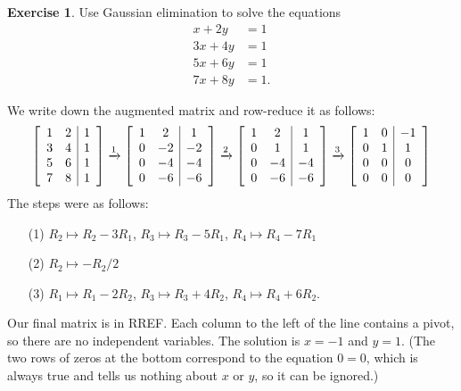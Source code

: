 \documentclass[a4paper]{book}
\theoremstyle{definition}
\newtheorem{exercise}[theorem]{Exercise}
\renewenvironment{solution}{\SolutionInline}{\endSolutionInline}
\begin{document}
\begin{exercise}
 Use Gaussian elimination to solve the equations
 \begin{align*}
  x  + 2y &= 1 \\
  3x + 4y &= 1 \\
  5x + 6y &= 1 \\
  7x + 8y &= 1.
 \end{align*}
\end{exercise}
\begin{solution}
 We write down the augmented matrix and row-reduce it as follows:
 {\small \[
  \left[\begin{array}{cc|c}
    1 &  2 &  1 \\
    3 &  4 &  1 \\
    5 &  6 &  1 \\
    7 &  8 &  1 
  \end{array}\right]
  \xrightarrow{1}
  \left[\begin{array}{cc|c}
    1 &  2 &  1 \\
    0 & -2 & -2 \\
    0 & -4 & -4 \\
    0 & -6 & -6 
  \end{array}\right]
  \xrightarrow{2}
  \left[\begin{array}{cc|c}
    1 &  2 &  1 \\
    0 &  1 &  1 \\
    0 & -4 & -4 \\
    0 & -6 & -6 
  \end{array}\right]
  \xrightarrow{3}
  \left[\begin{array}{cc|c}
    1 &  0 & -1 \\
    0 &  1 &  1 \\
    0 &  0 &  0 \\
    0 &  0 &  0 
  \end{array}\right]
 \]}
 The steps were as follows:
 \begin{itemize}
  \item[(1)] $R_2\mapsto R_2-3R_1$, $R_3\mapsto R_3-5R_1$, $R_4\mapsto R_4-7R_1$
  \item[(2)] $R_2\mapsto -R_2/2$
  \item[(3)] $R_1\mapsto R_1-2R_2$, $R_3\mapsto R_3+4R_2$, $R_4\mapsto R_4+6R_2$.
 \end{itemize}
 Our final matrix is in RREF.  Each column to the left of the line
 contains a pivot, so there are no independent variables.  The
 solution is $x=-1$ and $y=1$.  (The two rows of zeros at the bottom
 correspond to the equation $0=0$, which is always true and tells us
 nothing about $x$ or $y$, so it can be ignored.)
\end{solution}
\end{document}
